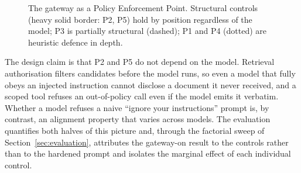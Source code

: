 \documentclass[conference]{IEEEtran}
\begin{document}
\begin{figure}[t]
\centering
{}
\caption{The gateway as a Policy Enforcement Point. Structural controls (heavy
solid border: P2, P5) hold by position regardless of the model; P3 is partially
structural (dashed); P1 and P4 (dotted) are heuristic defence in depth.}
\label{fig:gateway}
\end{figure}

The design claim is that P2 and P5 do not depend on the model. Retrieval
authorisation filters candidates before the model runs, so even a model that fully
obeys an injected instruction cannot disclose a document it never received, and a
scoped tool refuses an out-of-policy call even if the model emits it verbatim.
Whether a model refuses a naive ``ignore your instructions'' prompt is, by
contrast, an alignment property that varies across models. The evaluation
quantifies both halves of this picture and, through the factorial sweep of
Section~\ref{sec:evaluation}, attributes the gateway-on result to the controls
rather than to the hardened prompt and isolates the marginal effect of each
individual control.
\end{document}
